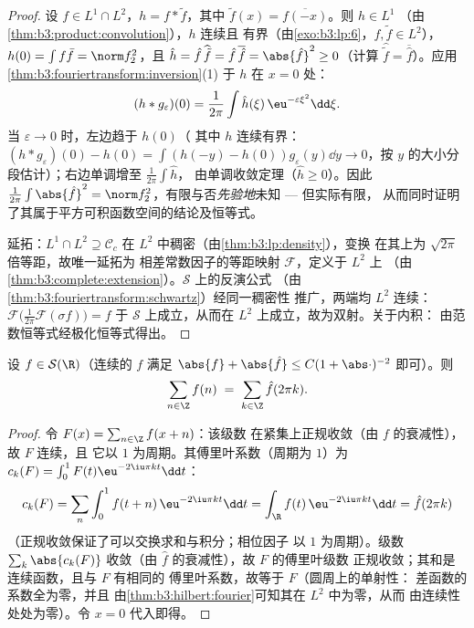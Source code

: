 \begin{proof}
设 $f \in L^1\cap L^2$，$h = f * \tilde f$，其中
$\tilde f(x) = \overline{f(-x)}$。则 $h \in L^1$
（由\cref{thm:b3:product:convolution}），$h$ 连续且
有界（由\cref{exo:b3:lp:6}，$f, \tilde f \in L^2$），$h(0) =
\int f\bar f = \norm f_2^2$，且 $\hat h = \hat
f\,\widehat{\tilde f} = \hat f\,\overline{\hat f} =
\abs{\hat f}^2 \geq 0$（计算 $\widehat{\tilde f} =
\overline{\hat f}$）。应用
\cref{thm:b3:fouriertransform:inversion}(1) 于 $h$ 在 $x = 0$ 处：
\[
(h * g_\varepsilon)(0) = \frac1{2\pi}\int \hat
h(\xi)\,\eu^{-\varepsilon\xi^2}\dd\xi .
\]
当 $\varepsilon \to 0$ 时，左边趋于 $h(0)$（
其中 $h$ 连续有界：$(h*g_\varepsilon)(0) - h(0) = \int(h(-y)
- h(0))g_\varepsilon(y)\dd y \to 0$，按
$y$ 的大小分段估计）；右边单调增至 $\frac1{2\pi}\int\hat h$，
由单调收敛定理（$\hat h \geq 0$）。因此 $\frac1{2\pi}\int\abs{\hat f}^2 =
\norm f_2^2$，有限与否\emph{先验地}未知 --- 但实际有限，
从而同时证明了其属于平方可积函数空间的结论及恒等式。

延拓：$L^1\cap L^2 \supseteq \mathcal C_c$ 在
$L^2$ 中稠密（由\cref{thm:b3:lp:density}），变换
在其上为 $\sqrt{2\pi}$ 倍等距，故唯一延拓为
相差常数因子的等距映射 $\mathcal F$，定义于 $L^2$ 上
（由\cref{thm:b3:complete:extension}）。$\mathcal S$ 上的反演公式
（由\cref{thm:b3:fouriertransform:schwartz}）经同一稠密性
推广，两端均 $L^2$ 连续：$\mathcal
F\bigl(\frac1{2\pi}\mathcal F(\sigma f)\bigr) = f$ 于
$\mathcal S$ 上成立，从而在 $L^2$ 上成立，故为双射。关于内积：
由范数恒等式经极化恒等式得出。
\end{proof}

\begin{theorem}[泊松求和公式]
\label{thm:b3:fouriertransform:poisson}
设 $f \in \mathcal S(\R)$（连续的 $f$ 满足 $\abs{f} +
\abs{\hat f} \leq C(1 + \abs\cdot)^{-2}$
即可）。则
\[
\sum_{n\in\Z} f(n) \;=\; \sum_{k\in\Z}\hat f(2\pi k) .
\]
\end{theorem}

\begin{proof}
令 $F(x) = \sum_{n\in\Z}f(x + n)$：该级数
在紧集上正规收敛（由 $f$ 的衰减性），故 $F$ 连续，且
它以 $1$ 为周期。其傅里叶系数（周期为 $1$）为
$c_k(F) = \int_0^1F(t)\eu^{-2\iu\pi kt}\dd t$：
\[
c_k(F) = \sum_n\int_0^1 f(t + n)\,\eu^{-2\iu\pi kt}\dd t
= \int_\R f(t)\,\eu^{-2\iu\pi kt}\dd t = \hat f(2\pi k)
\]
（正规收敛保证了可以交换求和与积分；相位因子
以 $1$ 为周期）。级数 $\sum_k\abs{c_k(F)}$
收敛（由 $\hat f$ 的衰减性），故 $F$ 的傅里叶级数
正规收敛；其和是连续函数，且与 $F$ 有相同的
傅里叶系数，故等于 $F$（圆周上的单射性：
差函数的系数全为零，并且
由\cref{thm:b3:hilbert:fourier}可知其在 $L^2$ 中为零，从而
由连续性处处为零）。令 $x = 0$ 代入即得。
\end{proof}

